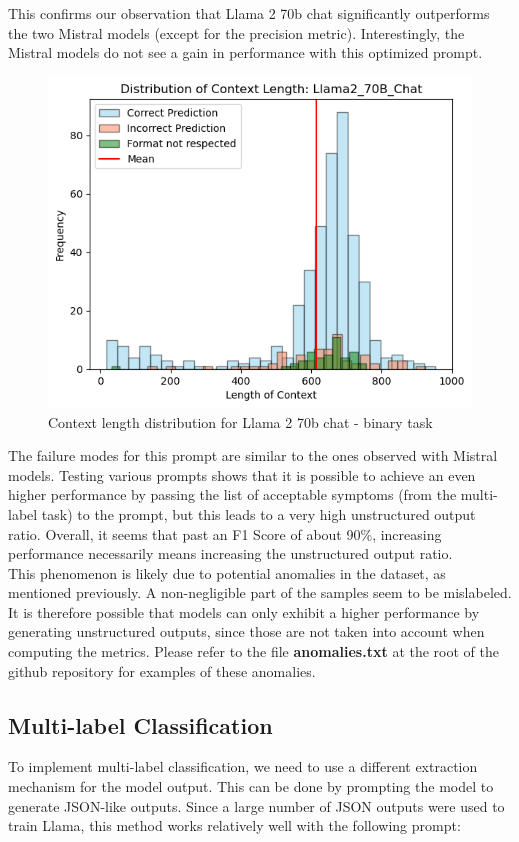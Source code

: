 \documentclass[11pt]{article}
\begin{document}
This confirms our observation that Llama 2 70b chat significantly outperforms the two Mistral models (except for the precision metric). Interestingly, the Mistral models do not see a gain in performance with this optimized prompt.\\

\begin{figure}[h]
    \centering
    \includegraphics[width=0.45\linewidth]{images/llama2/binary/prompt_8/llama2_context_length.png}
    \caption{Context length distribution for Llama 2 70b chat - binary task}
    \label{fig:enter-label}
\end{figure}

The failure modes for this prompt are similar to the ones observed with Mistral models. Testing various prompts shows that it is possible to achieve an even higher performance by passing the list of acceptable symptoms (from the multi-label task) to the prompt, but this leads to a very high unstructured output ratio. Overall, it seems that past an F1 Score of about 90\%, increasing performance necessarily means increasing the unstructured output ratio.\\

This phenomenon is likely due to potential anomalies in the dataset, as mentioned previously. A non-negligible part of the samples seem to be mislabeled. It is therefore possible that models can only exhibit a higher performance by generating unstructured outputs, since those are not taken into account when computing the metrics. Please refer to the file \textbf{anomalies.txt} at the root of the github repository for examples of these anomalies.

\subsection{Multi-label Classification}

To implement multi-label classification, we need to use a different extraction mechanism for the model output. This can be done by prompting the model to generate JSON-like outputs. Since a large number of JSON outputs were used to train Llama, this method works relatively well with the following prompt:\\
\end{document}
